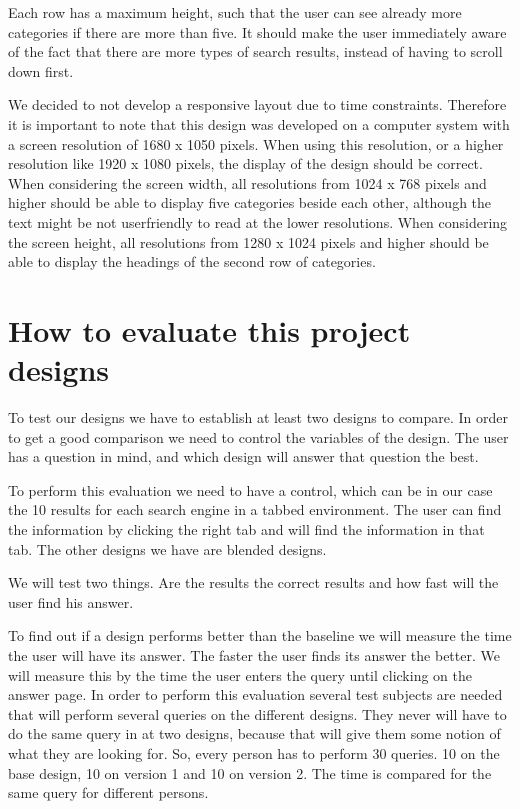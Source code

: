 \documentclass[12pt]{article}
\begin{document}
Each row has a maximum height, such that the user can see already more categories if there are more than five.
It should make the user immediately aware of the fact that there are more types of search results, instead of having to scroll down first.

We decided to not develop a responsive layout due to time constraints.
Therefore it is important to note that this design was developed on a computer system with a screen resolution of 1680 x 1050 pixels.
When using this resolution, or a higher resolution like 1920 x 1080 pixels, the display of the design should be correct.
When considering the screen width, all resolutions from 1024 x 768 pixels and higher should be able to display five categories beside each other, although the text might be not userfriendly to read at the lower resolutions.
When considering the screen height, all resolutions from 1280 x 1024 pixels and higher should be able to display the headings of the second row of categories.

\section{How to evaluate this project designs}
\label{sec:evaluation}
To test our designs we have to establish at least two designs to compare. 
In order to get a good comparison we need to control the variables of the design. 
The user has a question in mind, and which design will answer that question the best. 

To perform this evaluation we need to have a control, which can be in our case the 10 results for each search engine in a tabbed environment. The user can find the information by clicking the right tab and will find the information in that tab. The other designs we have are blended designs.

We will test two things. Are the results the correct results and how fast will the user find his answer. 

To find out if a design performs better than the baseline we will measure the time the user will have its answer. The faster the user finds its answer the better. We will measure this by the time the user enters the query until clicking on the answer page. In order to perform this evaluation several test subjects are needed that will perform several queries on the different designs. They never will have to do the same query in at two designs, because that will give them some notion of what they are looking for. So, every person has to perform 30 queries. 10 on the base design, 10 on version 1 and 10 on version 2. The time is compared for the same query for different persons.
\end{document}
